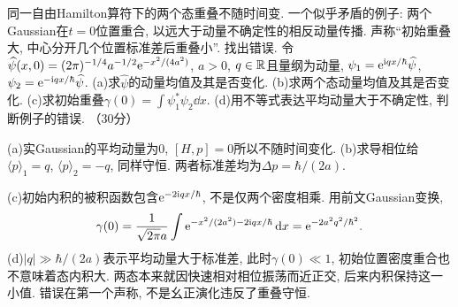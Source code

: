 \begin{exercise}
同一自由Hamilton算符下的两个态重叠不随时间变. 一个似乎矛盾的例子: 两个Gaussian在$t=0$位置重合, 以远大于动量不确定性的相反动量传播. 声称“初始重叠大, 中心分开几个位置标准差后重叠小”. 找出错误.
令$\widehat\psi(x,0)=(2\pi)^{-1/4}a^{-1/2}\mathrm e^{-x^2/(4a^2)}$, $a>0$, $q\in\mathbb R$且量纲为动量, $\psi_1=\mathrm e^{\mathrm i qx/\hbar}\widehat\psi$, $\psi_2=\mathrm e^{-\mathrm i qx/\hbar}\widehat\psi$.
(a)求$\widehat\psi$的动量均值及其是否变化.
(b)求两个态动量均值及其是否变化.
(c)求初始重叠$\gamma(0)=\int\psi_1^*\psi_2\dd x$.
(d)用不等式表达平均动量大于不确定性, 判断例子的错误. （30分）
\end{exercise}
\begin{solution}
(a)实Gaussian的平均动量为0, $[H,p]=0$所以不随时间变化. (b)求导相位给$\langle p\rangle_1=q$, $\langle p\rangle_2=-q$, 同样守恒. 两者标准差均为$\Delta p=\hbar/(2a)$.

(c)初始内积的被积函数包含$\mathrm e^{-2\mathrm i qx/\hbar}$, 不是仅两个密度相乘. 用前文Gaussian变换,
\[
\gamma(0)=\frac1{\sqrt{2\pi}a}\int
\mathrm e^{-x^2/(2a^2)-2\mathrm i qx/\hbar}\,\mathrm d x
=\mathrm e^{-2a^2q^2/\hbar^2}.
\]
(d)$|q|\gg\hbar/(2a)$表示平均动量大于标准差, 此时$\gamma(0)\ll1$, 初始位置密度重合也不意味着态内积大. 两态本来就因快速相对相位振荡而近正交, 后来内积保持这一小值. 错误在第一个声称, 不是幺正演化违反了重叠守恒.
\end{solution}
